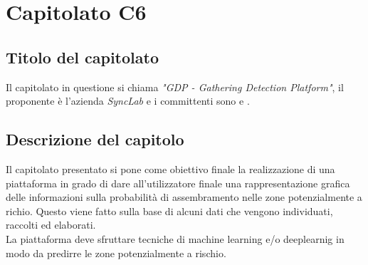 \section{Capitolato C6}
\subsection{Titolo del capitolato}
Il capitolato in questione si chiama \textit{"GDP - Gathering Detection Platform"}, il proponente \`e l'azienda \textit{SyncLab} e i committenti sono \VT{} e \CR{}.

\subsection{Descrizione del capitolo}
Il capitolato presentato si pone come obiettivo finale la realizzazione di una piattaforma in grado di dare all'utilizzatore finale una rappresentazione grafica delle informazioni sulla probabilità di assembramento nelle zone potenzialmente a richio. Questo viene fatto sulla base di alcuni dati che vengono individuati, raccolti ed elaborati. \\
La piattaforma deve sfruttare tecniche di machine learning e/o deeplearnig in modo da predirre le zone potenzialmente a rischio.


